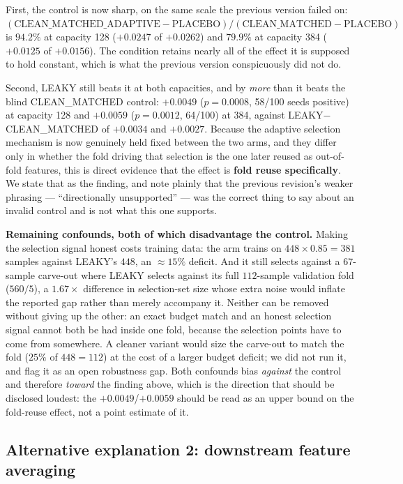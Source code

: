 \documentclass[10pt]{article} %
\begin{document}
First, the control is now sharp, on the same scale the previous version failed
on: $(\text{CLEAN\_MATCHED\_ADAPTIVE} - \text{PLACEBO}) /
(\text{CLEAN\_MATCHED} - \text{PLACEBO})$ is $94.2\%$ at capacity 128
($+0.0247$ of $+0.0262$) and $79.9\%$ at capacity 384 ($+0.0125$ of $+0.0156$).
The condition retains nearly all of the effect it is supposed to hold constant,
which is what the previous version conspicuously did not do.

Second, LEAKY still beats it at both capacities, and by \emph{more} than it
beats the blind CLEAN\_MATCHED control: $+0.0049$ ($p=0.0008$, 58/100 seeds
positive) at capacity 128 and $+0.0059$ ($p=0.0012$, 64/100) at 384, against
LEAKY$-$CLEAN\_MATCHED of $+0.0034$ and $+0.0027$. Because the adaptive
selection mechanism is now genuinely held fixed between the two arms, and they
differ only in whether the fold driving that selection is the one later reused
as out-of-fold features, this is direct evidence that the effect is
\textbf{fold reuse specifically}. We state that as the finding, and note
plainly that the previous revision's weaker phrasing --- ``directionally
unsupported'' --- was the correct thing to say about an invalid control and is
not what this one supports.

\medskip\noindent\textbf{Remaining confounds, both of which disadvantage the
control.} Making the selection signal honest costs training data: the arm
trains on $448 \times 0.85 = 381$ samples against LEAKY's $448$, an
$\approx$$15\%$ deficit. And it still selects against a $67$-sample carve-out
where LEAKY selects against its full $112$-sample validation fold ($560/5$), a
$1.67\times$ difference in selection-set size whose extra noise would inflate
the reported gap rather than merely accompany it. Neither can be removed
without giving up the other: an exact budget match and an honest selection
signal cannot both be had inside one fold, because the selection points have to
come from somewhere. A cleaner variant would size the carve-out to match the
fold ($25\%$ of $448=112$) at the cost of a larger budget deficit; we did not
run it, and flag it as an open robustness gap. Both confounds bias
\emph{against} the control and therefore \emph{toward} the finding above, which
is the direction that should be disclosed loudest: the $+0.0049$/$+0.0059$
should be read as an upper bound on the fold-reuse effect, not a point estimate
of it.

\subsection{Alternative explanation 2: downstream feature averaging}
\end{document}
